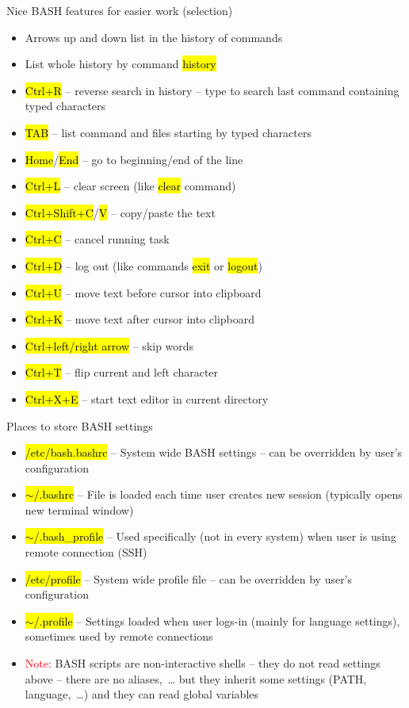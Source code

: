 \documentclass[compress, ucs, xelatex, 11pt, xcolor=svgnames,
  hyperref={
    bookmarks=true,
    unicode=true,
    colorlinks=true,
    pdftitle={Linux, command line and MetaCentrum},
    plainpages=false,
    pdfauthor={Vojtech Zeisek},
    pdfsubject={Course about use of Linux command line, writing shell scripts and using MetaCentrum of CESNET},
    pdfcreator={XeLaTeX},
    pdfkeywords={Linux, GNU, BASH, shell, command line, MetaCentrum},
    linkcolor=DarkRed,
    anchorcolor=DarkBlue,
    citecolor=Indigo,
    filecolor=NavyBlue,
    menucolor=DarkMagenta,
    urlcolor=DarkBlue,
    pdftex},
  url={hyphens, lowtilde} %
  ]{beamer}
\renewcommand{\texttt}[1]{\hl{\ttfamily #1}}
\renewcommand{\alert}[1]{\textcolor{red}{#1}}
\begin{document}
\begin{frame}{Nice BASH features for easier work (selection)}
  \begin{itemize}
    \item Arrows up and down list in the history of commands
    \item List whole history by command \texttt{history}
    \item \texttt{Ctrl+R} -- reverse search in history -- type to search last command containing typed characters
    \item \texttt{TAB} -- list command and files starting by typed characters
    \item \texttt{Home}/\texttt{End} -- go to beginning/end of the line
    \item \texttt{Ctrl+L} -- clear screen (like \texttt{clear} command)
    \item \texttt{Ctrl+Shift+C}/\texttt{V} -- copy/paste the text
    \item \texttt{Ctrl+C} -- cancel running task
    \item \texttt{Ctrl+D} -- log out (like commands \texttt{exit} or \texttt{logout})
    \item \texttt{Ctrl+U} -- move text before cursor into clipboard
    \item \texttt{Ctrl+K} -- move text after cursor into clipboard
    \item \texttt{Ctrl+left/right arrow} -- skip words
    \item \texttt{Ctrl+T} -- flip current and left character
    \item \texttt{Ctrl+X+E} -- start text editor in current directory
  \end{itemize}
\end{frame}

\begin{frame}{Places to store BASH settings}
  \begin{itemize}
    \item \texttt{/etc/bash.bashrc} -- System wide BASH settings -- can be overridden by user's configuration
    \item \texttt{$\sim$/.bashrc} -- File is loaded each time user creates new session (typically opens new terminal window)
    \item \texttt{$\sim$/.bash\_profile} -- Used specifically (not in every system) when user is using remote connection (SSH)
    \item \texttt{/etc/profile} -- System wide profile file -- can be overridden by user's configuration
    \item \texttt{$\sim$/.profile} -- Settings loaded when user logs-in (mainly for language settings), sometimes used by remote connections
    \item \alert{Note:} BASH scripts are non-interactive shells -- they do not read settings above -- there are no aliases,~\ldots{ }but they inherit some settings (PATH, language,~\ldots) and they can read global variables
  \end{itemize}
\end{frame}
\end{document}
